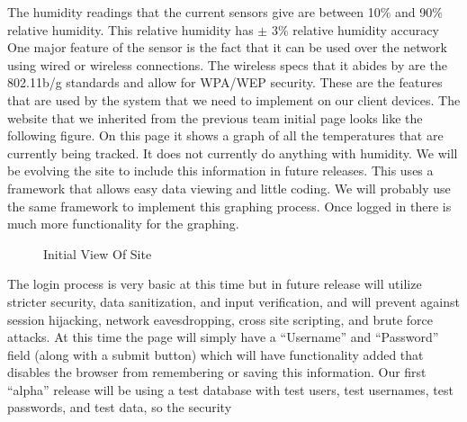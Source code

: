 \documentclass{report}
\begin{document}
 The humidity readings that the current sensors give are between 10$\%$ and 90$\%$ relative humidity. 
This relative humidity has $\pm$ 3$\%$ relative humidity accuracy One major feature of the sensor is the fact that it can be used over the network using wired or wireless connections. 
The wireless specs that it abides by are the 802.11b/g standards and allow for WPA/WEP security. 
These are the features that are used by the system that we need to implement on our client devices.
\newline
\indent
The website that we inherited from the previous team initial page looks like the following figure. 
On this page it shows a graph of all the temperatures that are currently being tracked. 
It does not currently do anything with humidity.  We will be evolving the site to include this information in future releases. 
This uses a framework that allows easy data viewing and little coding. 
We will probably use the same framework to implement this graphing process. 
Once logged in there is much more functionality for the graphing. 
\begin{figure}[H]
\caption{Initial View Of Site}
\end{figure}
The login process is very basic at this time but in future release will utilize stricter security, data sanitization, and input verification,
and will prevent against session hijacking, network eavesdropping, cross site scripting, and brute force attacks. 
At this time the page will simply have a “Username” and “Password” field (along with a submit button) which will have functionality
added that disables the browser from remembering or saving this information. 
Our first “alpha” release will be using a test database with test users, test usernames, test passwords, and test data, so the security
\end{document}
